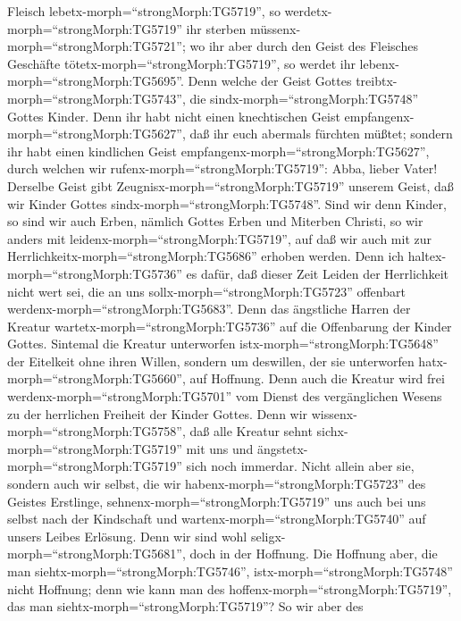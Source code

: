Fleisch lebetx-morph=``strongMorph:TG5719'', so
werdetx-morph=``strongMorph:TG5719'' ihr sterben
müssenx-morph=``strongMorph:TG5721''; wo ihr aber durch den Geist des
Fleisches Geschäfte tötetx-morph=``strongMorph:TG5719'', so werdet ihr
lebenx-morph=``strongMorph:TG5695''.  Denn welche der Geist
Gottes treibtx-morph=``strongMorph:TG5743'', die
sindx-morph=``strongMorph:TG5748'' Gottes Kinder.  Denn ihr
habt nicht einen knechtischen Geist
empfangenx-morph=``strongMorph:TG5627'', daß ihr euch abermals fürchten
müßtet; sondern ihr habt einen kindlichen Geist
empfangenx-morph=``strongMorph:TG5627'', durch welchen wir
rufenx-morph=``strongMorph:TG5719'': Abba, lieber Vater! 
Derselbe Geist gibt Zeugnisx-morph=``strongMorph:TG5719'' unserem Geist,
daß wir Kinder Gottes sindx-morph=``strongMorph:TG5748''. 
Sind wir denn Kinder, so sind wir auch Erben, nämlich Gottes Erben und
Miterben Christi, so wir anders mit
leidenx-morph=``strongMorph:TG5719'', auf daß wir auch mit zur
Herrlichkeitx-morph=``strongMorph:TG5686'' erhoben werden. 
Denn ich haltex-morph=``strongMorph:TG5736'' es dafür, daß dieser Zeit
Leiden der Herrlichkeit nicht wert sei, die an uns
sollx-morph=``strongMorph:TG5723'' offenbart
werdenx-morph=``strongMorph:TG5683''.  Denn das ängstliche
Harren der Kreatur wartetx-morph=``strongMorph:TG5736'' auf die
Offenbarung der Kinder Gottes.  Sintemal die Kreatur
unterworfen istx-morph=``strongMorph:TG5648'' der Eitelkeit ohne ihren
Willen, sondern um deswillen, der sie unterworfen
hatx-morph=``strongMorph:TG5660'', auf Hoffnung.  Denn auch
die Kreatur wird frei werdenx-morph=``strongMorph:TG5701'' vom Dienst
des vergänglichen Wesens zu der herrlichen Freiheit der Kinder Gottes.
 Denn wir wissenx-morph=``strongMorph:TG5758'', daß alle
Kreatur sehnt sichx-morph=``strongMorph:TG5719'' mit uns und
ängstetx-morph=``strongMorph:TG5719'' sich noch immerdar. 
Nicht allein aber sie, sondern auch wir selbst, die wir
habenx-morph=``strongMorph:TG5723'' des Geistes Erstlinge,
sehnenx-morph=``strongMorph:TG5719'' uns auch bei uns selbst nach der
Kindschaft und wartenx-morph=``strongMorph:TG5740'' auf unsers Leibes
Erlösung.  Denn wir sind wohl
seligx-morph=``strongMorph:TG5681'', doch in der Hoffnung. Die Hoffnung
aber, die man siehtx-morph=``strongMorph:TG5746'',
istx-morph=``strongMorph:TG5748'' nicht Hoffnung; denn wie kann man des
hoffenx-morph=``strongMorph:TG5719'', das man
siehtx-morph=``strongMorph:TG5719''?  So wir aber des
